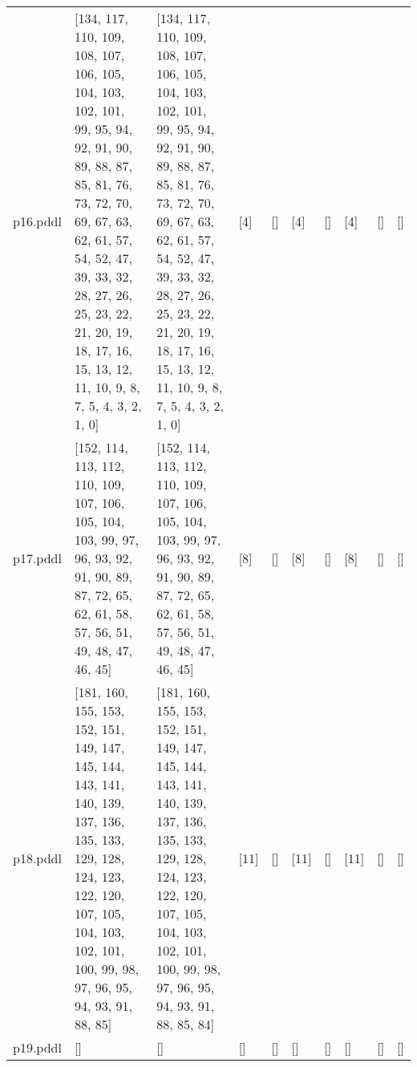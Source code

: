 \documentclass{article}
\begin{document}
\begin{tabular}{@{}lrrrrrrrrr@{}}
p16.pddl & \multicolumn{1}{|l|}{[134, 117, 110, 109, 108, 107, 106, 105, 104, 103, 102, 101, 99, 95, 94, 92, 91, 90, 89, 88, 87, 85, 81, 76, 73, 72, 70, 69, 67, 63, 62, 61, 57, 54, 52, 47, 39, 33, 32, 28, 27, 26, 25, 23, 22, 21, 20, 19, 18, 17, 16, 15, 13, 12, 11, 10, 9, 8, 7, 5, 4, 3, 2, 1, 0]} & \multicolumn{1}{|l|}{[134, 117, 110, 109, 108, 107, 106, 105, 104, 103, 102, 101, 99, 95, 94, 92, 91, 90, 89, 88, 87, 85, 81, 76, 73, 72, 70, 69, 67, 63, 62, 61, 57, 54, 52, 47, 39, 33, 32, 28, 27, 26, 25, 23, 22, 21, 20, 19, 18, 17, 16, 15, 13, 12, 11, 10, 9, 8, 7, 5, 4, 3, 2, 1, 0]} & \multicolumn{1}{|l|}{[4]} & \multicolumn{1}{|l|}{[]} & \multicolumn{1}{|l|}{[4]} & \multicolumn{1}{|l|}{[]} & \multicolumn{1}{|l|}{[4]} & \multicolumn{1}{|l|}{[]} & \multicolumn{1}{|l|}{[]} \\
p17.pddl & \multicolumn{1}{|l|}{[152, 114, 113, 112, 110, 109, 107, 106, 105, 104, 103, 99, 97, 96, 93, 92, 91, 90, 89, 87, 72, 65, 62, 61, 58, 57, 56, 51, 49, 48, 47, 46, 45]} & \multicolumn{1}{|l|}{[152, 114, 113, 112, 110, 109, 107, 106, 105, 104, 103, 99, 97, 96, 93, 92, 91, 90, 89, 87, 72, 65, 62, 61, 58, 57, 56, 51, 49, 48, 47, 46, 45]} & \multicolumn{1}{|l|}{[8]} & \multicolumn{1}{|l|}{[]} & \multicolumn{1}{|l|}{[8]} & \multicolumn{1}{|l|}{[]} & \multicolumn{1}{|l|}{[8]} & \multicolumn{1}{|l|}{[]} & \multicolumn{1}{|l|}{[]} \\
p18.pddl & \multicolumn{1}{|l|}{[181, 160, 155, 153, 152, 151, 149, 147, 145, 144, 143, 141, 140, 139, 137, 136, 135, 133, 129, 128, 124, 123, 122, 120, 107, 105, 104, 103, 102, 101, 100, 99, 98, 97, 96, 95, 94, 93, 91, 88, 85]} & \multicolumn{1}{|l|}{[181, 160, 155, 153, 152, 151, 149, 147, 145, 144, 143, 141, 140, 139, 137, 136, 135, 133, 129, 128, 124, 123, 122, 120, 107, 105, 104, 103, 102, 101, 100, 99, 98, 97, 96, 95, 94, 93, 91, 88, 85, 84]} & \multicolumn{1}{|l|}{[11]} & \multicolumn{1}{|l|}{[]} & \multicolumn{1}{|l|}{[11]} & \multicolumn{1}{|l|}{[]} & \multicolumn{1}{|l|}{[11]} & \multicolumn{1}{|l|}{[]} & \multicolumn{1}{|l|}{[]} \\
p19.pddl & \multicolumn{1}{|l|}{[]} & \multicolumn{1}{|l|}{[]} & \multicolumn{1}{|l|}{[]} & \multicolumn{1}{|l|}{[]} & \multicolumn{1}{|l|}{[]} & \multicolumn{1}{|l|}{[]} & \multicolumn{1}{|l|}{[]} & \multicolumn{1}{|l|}{[]} & \multicolumn{1}{|l|}{[]} \\

\end{tabular}
\end{document}
